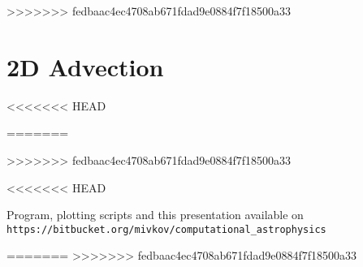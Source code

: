 >>>>>>> fedbaac4ec4708ab671fdad9e0884f7f18500a33



\section{2D Advection}
<<<<<<< HEAD




=======







>>>>>>> fedbaac4ec4708ab671fdad9e0884f7f18500a33





<<<<<<< HEAD
\begin{frame}[fragile]
	Program, plotting scripts and this presentation available on \verb!https://bitbucket.org/mivkov/computational_astrophysics!
\end{frame}
=======
>>>>>>> fedbaac4ec4708ab671fdad9e0884f7f18500a33












